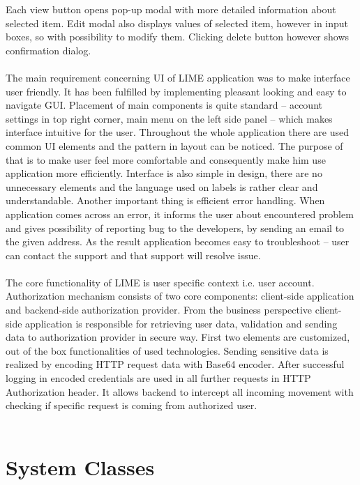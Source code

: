 \documentclass[a4paper,11pt,twoside]{report}
\theoremstyle{definition}
\begin{document}
Each view button opens pop-up modal with more detailed information about selected item. Edit modal also displays values of selected item, however in input boxes, so with possibility to modify them. Clicking delete button however shows confirmation dialog.\\ \\

The main requirement concerning UI of LIME application was to make interface user friendly. It has been fulfilled by implementing pleasant looking and easy to navigate GUI. Placement of main components is quite standard – account settings in top right corner, main menu on the left side panel – which makes interface intuitive for the user. Throughout the whole application there are used common UI elements and the pattern in layout can be noticed. The purpose of that is to make user feel more comfortable and consequently make him use application more efficiently. Interface is also simple in design, there are no unnecessary elements and the language used on labels is rather clear and understandable. Another important thing is efficient error handling. When application comes across an error, it informs the user about encountered problem and gives possibility of reporting bug to the developers, by sending an email to the given address. As the result application becomes easy to troubleshoot – user can contact the support and that support will resolve issue. \\ \\

The core functionality of LIME is user specific context i.e. user account. Authorization mechanism consists of two core components: client-side application and backend-side authorization provider. From the business perspective client-side application is responsible for retrieving user data, validation and sending data to authorization provider in secure way. First two elements are customized, out of the box functionalities of used technologies. Sending sensitive data is realized by encoding HTTP request data with Base64 encoder. After successful logging in encoded credentials are used in all further requests in HTTP Authorization header. It allows backend to intercept all incoming movement with checking if specific request is coming from authorized user.\\ \\


\section{System Classes}
\end{document}
